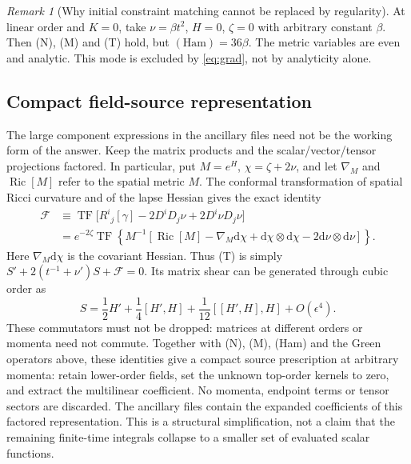 \documentclass[11pt]{article}
\theoremstyle{definition}
\theoremstyle{remark}
\newtheorem{remark}[theorem]{Remark}
\newcommand{\eps}{\epsilon}
\newcommand{\dd}{\mathrm{d}}
\newcommand{\TF}{\operatorname{TF}}
\begin{document}
\begin{remark}[Why initial constraint matching cannot be replaced by regularity]
At linear order and $K=0$, take $\nu=\beta t^2$, $H=0$, $\zeta=0$ with arbitrary constant
$\beta$. Then (N), (M) and (T) hold, but $(\mathrm{Ham})=36\beta$. The metric variables are
even and analytic. This mode is excluded by \eqref{eq:grad}, not by analyticity alone.
\end{remark}

\subsection{Compact field-source representation}\label{sec:compact-fields}
The large component expressions in the ancillary files need not be the working form of the
answer. Keep the matrix products and the scalar/vector/tensor projections factored. In
particular, put $M=e^H$, $\chi=\zeta+2\nu$, and let $\nabla_M$ and
$\operatorname{Ric}[M]$ refer to the spatial metric $M$. The conformal transformation of
spatial Ricci curvature and of the lapse Hessian gives the exact identity
\begin{equation}\label{eq:compact-driver}
\begin{split}
\mathcal F&\equiv\TF\big[R^i{}_j[\gamma]-2D^iD_j\nu+2D^i\nu D_j\nu\big]\\
&=e^{-2\zeta}\TF\!\left\{M^{-1}\left[
\operatorname{Ric}[M]-\nabla_M\dd\chi
+\dd\chi\otimes\dd\chi-2\dd\nu\otimes\dd\nu\right]\right\}.
\end{split}
\end{equation}
Here $\nabla_M\dd\chi$ is the covariant Hessian. Thus (T) is simply
$S'+2(t^{-1}+\nu')S+\mathcal F=0$. Its matrix shear can be generated through cubic order as
\begin{equation}\label{eq:compact-shear}
S=\frac12H'+\frac14[H',H]+\frac1{12}[[H',H],H]+O(\eps^4).
\end{equation}
These commutators must not be dropped: matrices at different orders or momenta need not
commute. Together with (N), (M), (Ham) and the Green operators above, these identities give a
compact source prescription at arbitrary momenta: retain lower-order fields, set the unknown
top-order kernels to zero, and extract the multilinear coefficient. No momenta, endpoint
terms or tensor sectors are discarded. The ancillary files contain the expanded coefficients
of this factored representation. This is a structural simplification, not a claim that the
remaining finite-time integrals collapse to a smaller set of evaluated scalar functions.
\end{document}
